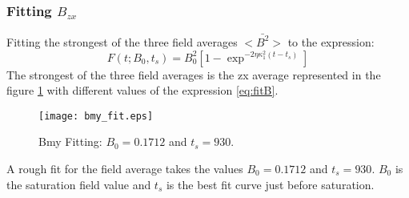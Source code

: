 \subsubsection{Fitting $B_{zx}$}
Fitting the strongest of the three field averages $<\bar{B^2}>$ to the expression:
\begin{equation}
 F(t;B_0,t_s)=B_0^2[1-\exp^{-2\eta\kappa_1^2(t-t_s)}]
\label{eq:fitB}
\end{equation}
The strongest of the three field averages is the zx average represented in the figure \ref{fig:bmy_fit} with different values of the expression \ref{eq:fitB}.
\begin{figure}[h]
\centering
\texttt{[image: bmy\_fit.eps]}
\caption{Bmy Fitting: $B_0=0.1712$ and $t_s = 930$.}
\label{fig:bmy_fit}
 \end{figure}
A rough fit for the field average takes the values $B_0=0.1712$ and $t_s = 930$.
$B_0$ is the saturation field value and $t_s$ is the best fit curve just before saturation.

